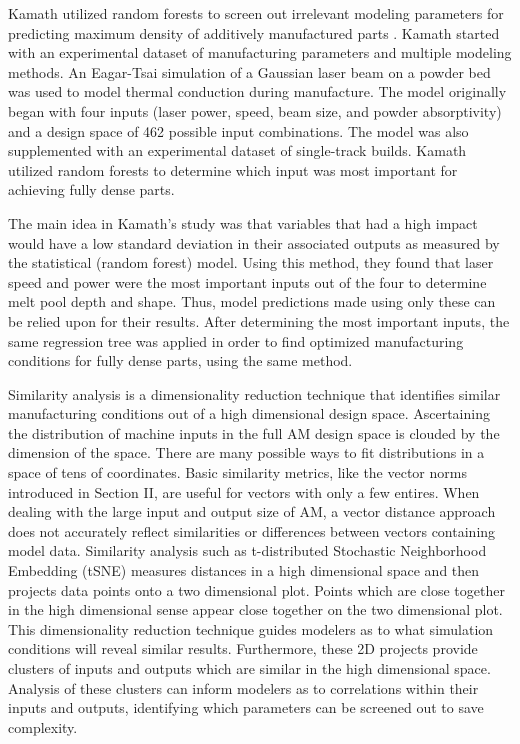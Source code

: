 Kamath utilized random forests to screen out irrelevant modeling parameters for predicting maximum density of additively manufactured parts \cite{Kamath2016}. Kamath started with an experimental dataset of manufacturing parameters and multiple modeling methods. An Eagar-Tsai simulation of a Gaussian laser beam on a powder bed was used to model thermal conduction during manufacture. The model originally began with four inputs (laser power, speed, beam size, and powder absorptivity) and a design space of 462 possible input combinations. The model was also supplemented with an experimental dataset of single-track builds. Kamath utilized random forests to determine which input was most important for achieving fully dense parts.

The main idea in Kamath's study was that variables that had a high impact would have a low standard deviation in their associated outputs as measured by the statistical (random forest) model. Using this method, they found that laser speed and power were the most important inputs out of the four to determine melt pool depth and shape. Thus, model predictions made using only these can be relied upon for their results.  After determining the most important inputs, the same regression tree was applied in order to find optimized manufacturing conditions for fully dense parts, using the same method. 

Similarity analysis is a dimensionality reduction technique that identifies similar manufacturing conditions out of a high dimensional design space. Ascertaining the distribution of machine inputs in the full AM design space is clouded by the dimension of the space. There are many possible ways to fit distributions in a space of tens of coordinates. Basic similarity metrics, like the vector norms introduced in Section II, are useful for vectors with only a few entires. When dealing with the large input and output size of AM, a vector distance approach does not accurately reflect similarities or differences between vectors containing model data. Similarity analysis such as t-distributed Stochastic Neighborhood Embedding (tSNE) measures distances in a high dimensional space and then projects data points onto a two dimensional plot. Points which are close together in the high dimensional sense appear close together on the two dimensional plot. This dimensionality reduction technique guides modelers as to what simulation conditions will reveal similar results. Furthermore, these 2D projects provide clusters of inputs and outputs which are similar in the high dimensional space. Analysis of these clusters can inform modelers as to correlations within their inputs and outputs, identifying which parameters can be screened out to save complexity.


